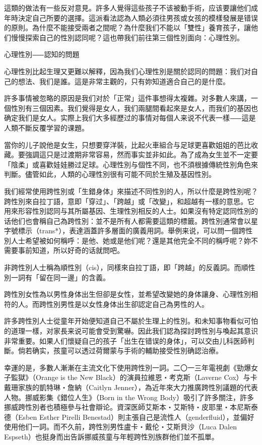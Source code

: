 \documentclass[12pt,UTF8]{ctexbook}
\begin{document}
這類的做法有一些反对意見。許多人覺得這些孩子不该被動手術，应该要讓他们成年時決定自己所要的選擇。這派看法認為人類必須往男孩或女孩的模樣發展是错误的原則。為什麼不能接受兩者之間呢？為什麼我们不能以「雙性」養育孩子，讓他们慢慢探索自己的性別認同呢？這也帶我们前往第三個性別面向：心理性別。





心理性別⸺認知的問題




心理性別比起生理又更難以解釋，因為我们心理性別是關於認同的問題：我们对自己的想法、我们是誰。這是非常主觀的，只有妳知道適合自己的是什麼。

許多事情被忽略的原因是我们对於「正常」這件事想得太複雜。对多數人來講，一個性別有三個因素。我们覺得是女人，我们兩腿間看起來是女人，而我们的基因也确定我们是女人。实際上我们大多經歷过的事情对每個人来说不代表一樣⸺這是人類不斷反覆学習的课題。

當你的儿子說他是女生，只想要穿洋裝，比起火車組合与足球更喜歡姐姐的芭比收藏。要強調這只是过渡期非常容易，然而事实並非如此。為了成為女生並不一定要「陰柔」或喜歡娃娃勝过足球。心理性別与個性不同，也不須根據傳統性別角色來判斷。儘管如此，人類的心理性別很有可能不同於生殖及基因性別。

我们經常使用跨性別或「生錯身体」來描述不同性別的人，所以什麼是跨性別呢？跨性別來自拉丁語，意即「穿过」、「跨越」或「改變」，和超越有一樣的意思。它用來形容性別認同与其所屬基因、生理性別相反的人士。如果沒有特定認同性別的话他们也會稱自己為跨性別：並不是所有人都需要這類的標籤。跨性別通常會以星字號標示（trans*），表達涵蓋許多層面的廣義用詞。舉例来说，可以問一個跨性別人士希望被如何稱呼：是他、她或是他们呢？還是其他完全不同的稱呼呢？妳不需要事前知道，所以好奇的话就問吧。

非跨性別人士稱為順性別（cis），同樣來自拉丁語，即「跨越」的反義詞。而順性別一詞有「留在同一邊」的含義。

跨性別女性為以男性身体出生但卻是女性，並希望改變她的身体讓身、心理性別相符的人。而跨性別男性是以女性身体出生卻認定自己為男性的人。

許多跨性別人士從童年开始便知道自己不屬於生理上的性別。和未知事物看似可怕的道理一樣，对家長来说可能會受到驚嚇。因此我们認為探討跨性別与喚起其意识非常重要。如果人们懷疑自己的孩子「出生在错误的身体」，可以交由儿科医師判斷。倘若确实，孩童可以透过荷爾蒙与手術的輔助接受性別确認治療。

幸運的是，多數人漸漸在主流文化下使用跨性別一詞。二〇一三年電視劇《勁爆女子監獄》（Orange is the New Black）的演員拉維恩‧考克斯（Laverne Cox）与卡戴珊家族的凱特琳‧詹納（Caitlyn Jenner），為近年來大力推廣跨性別議題的代表人物。挪威影集《錯位人生》（Born in the Wrong Body）吸引了許多關注，許多挪威跨性別者也積極參与社會辯论。資深医師艾斯本‧艾斯特‧皮耶里‧本尼斯泰德（Esben Esther Pirelli Benestad）則主張自己是流性人（genderfluid），並偏好使用他们一詞。而不久前，跨性別男性盧卡‧戴伦‧艾斯貝沙（Luca Dalen Espseth）也挺身而出告訴挪威孩童与年輕跨性別族群他们並不孤單。
\end{document}
